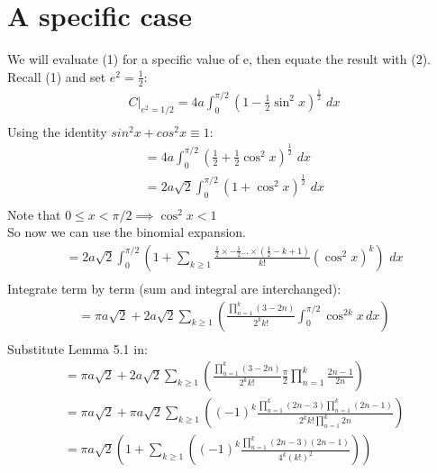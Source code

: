 \documentclass{article}
\begin{document}
\section{A specific case} 
We will evaluate (1) for a specific value of e, then equate the result with (2). Recall (1) and set $e^2 = \frac{1}{2}$:
\begin{equation*}
\begin{split}
	C\biggr\rvert_{e^2=1/2} = 4a\int_{0}^{\pi/2}(1 - \frac{1}{2}\sin^2x)^\frac{1}{2}\,\,dx\\
\end{split}
\end{equation*}
Using the identity $sin^2x + cos^2x \equiv 1$:
\begin{equation*}
\begin{split}
	= 4a\int_{0}^{\pi/2}(\frac{1}{2} + \frac{1}{2}\cos^2x)^\frac{1}{2}\,\,dx\\
	= 2a\sqrt2\int_{0}^{\pi/2}(1 + \cos^2x)^\frac{1}{2}\,\,dx\\
\end{split}
\end{equation*}
Note that $0 \leq x < \pi/2 \implies \cos^2x < 1$\\
So now we can use the binomial expansion.
\begin{equation*}
\begin{split}
	= 2a\sqrt2\int_{0}^{\pi/2}\left( 1 + \sum_{k\geq 1} \frac{\frac{1}{2}\times-\frac{1}{2}\dots\times(\frac{1}{2}-k+1)}{k!}\left(\cos^2x\right)^k \right)\,\,dx\\
\end{split}
\end{equation*}
Integrate term by term (sum and integral are interchanged):
\begin{equation*}
\begin{split}
	= \pi a\sqrt{2} +
	2a\sqrt{2}\sum_{k\geq 1}\left( \frac{\prod_{n=1}^{k}(3-2n)}{2^kk!}\int_{0}^{\pi/2}\cos^{2k}x\,dx\right)\\
\end{split}
\end{equation*}
Substitute Lemma 5.1 in:
\begin{equation*}
\begin{split}
	= \pi a\sqrt{2} +
	2a\sqrt{2}\sum_{k\geq 1}\left( \frac{\prod_{n=1}^{k}(3-2n)}{2^kk!}\frac{\pi}{2}\prod_{n=1}^k\frac{2n-1}{2n}\right)\\
	= \pi a\sqrt{2} +
	\pi a\sqrt{2}\sum_{k\geq 1}\left( (-1)^k\frac{\prod_{n=1}^{k}(2n-3)\prod_{n=1}^k(2n-1)}{2^kk!\prod_{n=1}^k 2n}\right)\\
	= \pi a\sqrt{2} \left( 1 +
	\sum_{k\geq 1}\left( (-1)^k\frac{\prod_{n=1}^{k}(2n-3)(2n-1)}{4^k(k!)^2}\right)\right)\\
\end{split}
\end{equation*}
\end{document}
